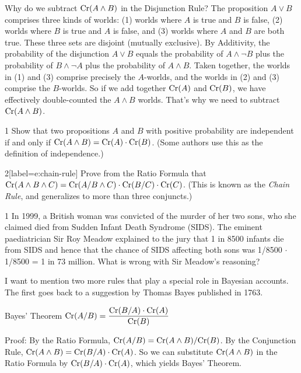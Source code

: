 Why do we subtract $\text{Cr}(A \land B)$ in the Disjunction Rule? The proposition
$A\lor B$ comprises three kinds of worlds: (1) worlds where $A$ is true and $B$
is false, (2) worlds where $B$ is true and $A$ is false, and (3) worlds where
$A$ and $B$ are both true. These three sets are disjoint (mutually exclusive).
By Additivity, the probability of the disjunction $A \lor B$ equals the
probability of $A \land \neg B$ plus the probability of $B \land \neg A$ plus
the probability of $A \land B$. Taken together, the worlds in (1) and (3)
comprise precisely the $A$-worlds, and the worlds in (2) and (3) comprise the
$B$-worlds. So if we add together $\text{Cr}(A)$ and $\text{Cr}(B)$, we have effectively
double-counted the $A \land B$ worlds. That's why we need to subtract
$\text{Cr}(A \land B)$.

\begin{exercise}{1}
  Show that two propositions $A$ and $B$ with positive probability are independent
  if and only if $\text{Cr}(A \land B) = \text{Cr}(A) \cdot \text{Cr}(B)$. (Some authors use this as
  the definition of independence.)
\end{exercise}

\begin{exercise}{2}[label=e:chain-rule]
  Prove from the Ratio Formula that $\text{Cr}(A \land B \land C) = \text{Cr}(A/B
  \land C) \cdot \text{Cr}(B/C) \cdot \text{Cr}(C)$. (This is known as the \emph{Chain Rule}, and generalizes to more than three conjuncts.)
  \vspace{-2mm}
\end{exercise}

\begin{exercise}{1}
  In 1999, a British woman was convicted of the murder of her two
  sons, who she claimed died from Sudden Infant Death Syndrome
  (SIDS). The eminent paediatrician Sir Roy Meadow explained to the
  jury that 1 in 8500 infants die from SIDS and hence that the chance of
  SIDS affecting both sons was 1/8500 $\cdot$ 1/8500 = 1 in 73
  million. What is wrong with Sir Meadow's reasoning? 
\end{exercise}

I want to mention two more rules that play a special role in Bayesian accounts.
The first goes back to a suggestion by Thomas Bayes published in 1763.
%
\begin{genericthm}{Bayes' Theorem}
  \quad\newline
  $\text{Cr}(A/B) = \dfrac{\text{Cr}(B/A) \cdot \text{Cr}(A)}{\text{Cr}(B)}$
\end{genericthm}
%
\noindent%
Proof: By the Ratio Formula, $\text{Cr}(A/B) = \text{Cr}(A \land B) / \text{Cr}(B)$. By
the Conjunction Rule, $\text{Cr}(A \land B) = \text{Cr}(B/A) \cdot \text{Cr}(A)$. So we
can substitute $\text{Cr}(A \land B)$ in the Ratio Formula by
$\text{Cr}(B/A)\cdot \text{Cr}(A)$, which yields Bayes' Theorem.

